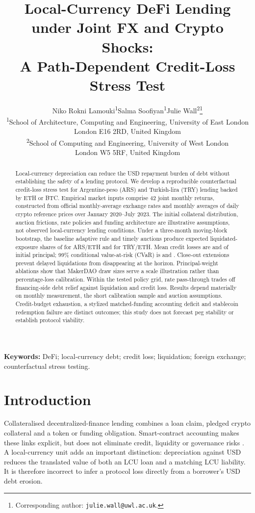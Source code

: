 \documentclass[11pt,a4paper]{article}
\title{Local-Currency DeFi Lending under Joint FX and Crypto Shocks:\\A Path-Dependent Credit-Loss Stress Test}
\author{Niko Rokni Lamouki\textsuperscript{1}\quad Salma Soofiyan\textsuperscript{1}\quad Julie Wall\textsuperscript{2}\thanks{Corresponding author: \texttt{julie.wall@uwl.ac.uk}.}\\[3pt]\small\textsuperscript{1}School of Architecture, Computing and Engineering, University of East London\\\small London E16 2RD, United Kingdom\\\small\textsuperscript{2}School of Computing and Engineering, University of West London\\\small London W5 5RF, United Kingdom}
\date{}
\begin{document}
\maketitle
\begin{abstract}
Local-currency depreciation can reduce the USD repayment burden of debt without establishing the safety of a lending protocol. We develop a reproducible counterfactual credit-loss stress test for Argentine-peso (ARS) and Turkish-lira (TRY) lending backed by ETH or BTC. Empirical market inputs comprise 42 joint monthly returns, constructed from official monthly-average exchange rates and monthly averages of daily crypto reference prices over January 2020--July 2023. The initial collateral distribution, auction frictions, rate policies and funding architecture are illustrative assumptions, not observed local-currency lending conditions. Under a three-month moving-block bootstrap, the baseline adaptive rule and timely auctions produce expected liquidated-exposure shares of \ArsLiq{} for ARS/ETH and \TryLiq{} for TRY/ETH. Mean credit losses are \ArsLoss{} and \TryLoss{} of initial principal; 99\% conditional value-at-risk (CVaR) is \ArsTail{} and \TryTail{}. Close-out extensions prevent delayed liquidations from disappearing at the horizon. Principal-weight ablations show that MakerDAO draw sizes serve a scale illustration rather than percentage-loss calibration. Within the tested policy grid, rate pass-through trades off financing-side debt relief against liquidation and credit loss. Results depend materially on monthly measurement, the short calibration sample and auction assumptions. Credit-budget exhaustion, a stylized matched-funding accounting deficit and stablecoin redemption failure are distinct outcomes; this study does not forecast peg stability or establish protocol viability.
\end{abstract}
\textbf{Keywords:} DeFi; local-currency debt; credit loss; liquidation; foreign exchange; counterfactual stress testing.

\section{Introduction}
Collateralised decentralized-finance lending combines a loan claim, pledged crypto collateral and a token or funding obligation. Smart-contract accounting makes these links explicit, but does not eliminate credit, liquidity or governance risks \cite{Schar2021,Werner2022,MakerVatDocs}. A local-currency unit adds an important distinction: depreciation against USD reduces the translated value of both an LCU loan and a matching LCU liability. It is therefore incorrect to infer a protocol loss directly from a borrower's USD debt erosion.
\end{document}
